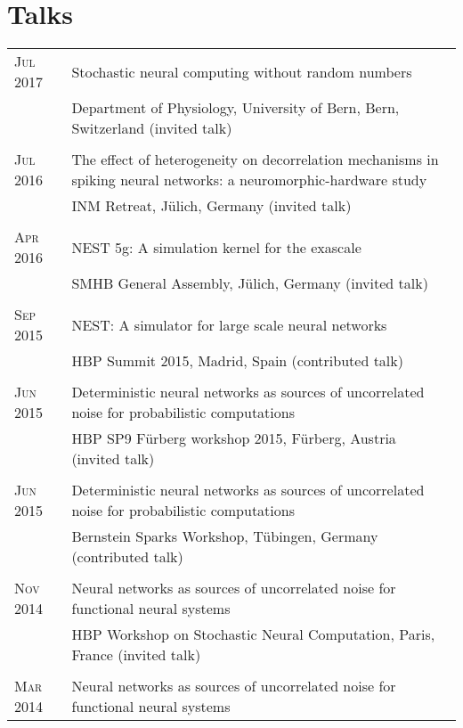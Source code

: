 \documentclass[a4paper,10pt]{article}
\begin{document}
\section{Talks}
\begin{longtable}{>{\hfill}p{1.6cm}|p{}}
  \textsc{Jul} 2017 & Stochastic neural computing without random numbers \\
  & \footnotesize Department of Physiology, University of Bern, Bern, Switzerland (invited talk) \\
  \multicolumn{2}{c}{} \\
  \textsc{Jul} 2016 & The effect of heterogeneity on decorrelation mechanisms in spiking neural networks: a neuromorphic-hardware study \\
  & \footnotesize INM Retreat, J\"ulich, Germany (invited talk)\\
  \multicolumn{2}{c}{} \\
  \textsc{Apr} 2016 & NEST 5g: A simulation kernel for the exascale \\
  & \footnotesize SMHB General Assembly, J\"ulich, Germany (invited talk)\\
  \multicolumn{2}{c}{} \\
  \textsc{Sep} 2015 & NEST: A simulator for large scale neural networks\\
  & \footnotesize HBP Summit 2015, Madrid, Spain (contributed talk)\\
  \multicolumn{2}{c}{} \\
  \textsc{Jun} 2015 & Deterministic neural networks as sources of uncorrelated noise for probabilistic computations\\
  & \footnotesize HBP SP9 F\"urberg workshop 2015, F\"urberg, Austria (invited talk)\\
  \multicolumn{2}{c}{} \\
  \textsc{Jun} 2015 & Deterministic neural networks as sources of uncorrelated noise for probabilistic computations \\
  & \footnotesize Bernstein Sparks Workshop, T\"ubingen, Germany (contributed talk)\\
  \multicolumn{2}{c}{} \\
  \textsc{Nov} 2014 & Neural networks as sources of uncorrelated noise for functional neural systems \\
  & \footnotesize HBP Workshop on Stochastic Neural Computation, Paris, France (invited talk)\\
  \multicolumn{2}{c}{} \\
  \textsc{Mar} 2014 & Neural networks as sources of uncorrelated noise for functional neural systems \\

\end{longtable}
\end{document}
